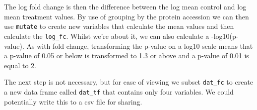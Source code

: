 \documentclass[12pt,]{book}
\newenvironment{Shaded}{\begin{snugshade}}{\end{snugshade}}
\newcommand{\CommentTok}[1]{\textcolor[rgb]{0.56,0.35,0.01}{\textit{#1}}}
\newcommand{\DataTypeTok}[1]{\textcolor[rgb]{0.13,0.29,0.53}{#1}}
\newcommand{\DecValTok}[1]{\textcolor[rgb]{0.00,0.00,0.81}{#1}}
\newcommand{\KeywordTok}[1]{\textcolor[rgb]{0.13,0.29,0.53}{\textbf{#1}}}
\newcommand{\NormalTok}[1]{#1}
\newcommand{\OperatorTok}[1]{\textcolor[rgb]{0.81,0.36,0.00}{\textbf{#1}}}
\newcommand{\StringTok}[1]{\textcolor[rgb]{0.31,0.60,0.02}{#1}}
\begin{document}
The log fold change is then the difference between the log mean control and
log mean treatment values. By use of grouping by the protein accession we
can then use \texttt{mutate} to create new variables that calculate the mean values
and then calculate the \texttt{log\_fc}. Whilst we're about it, we can also calculate
a -log10(p-value). As with fold change, transforming the p-value on a log10
scale means that a p-value of 0.05 or below is transformed to 1.3 or above and
a p-value of 0.01 is equal to 2.

\begin{Shaded}
\end{Shaded}

The next step is not necessary, but for ease of viewing we subset \texttt{dat\_fc} to
create a new data frame called \texttt{dat\_tf} that contains only four variables.
We could potentially write this to a csv file for sharing.

\begin{Shaded}
\end{Shaded}
\end{document}

